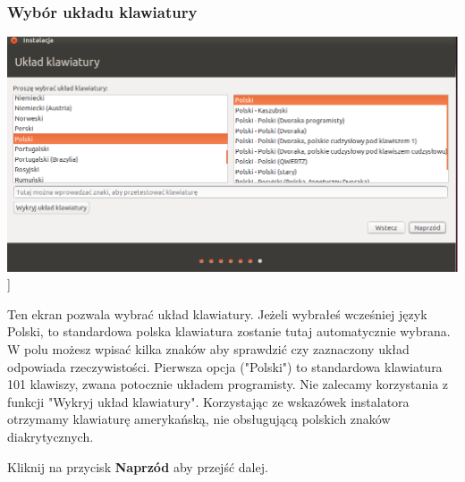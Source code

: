 \subsubsection{Wybór układu klawiatury}
\begin{center}
        \includegraphics[scale=0.5]{images/instalator_klawiatura.png}]
\end{center}
Ten ekran pozwala wybrać układ klawiatury. Jeżeli wybrałeś wcześniej język Polski, to standardowa polska klawiatura zostanie tutaj automatycznie wybrana. W polu możesz wpisać kilka znaków aby sprawdzić czy zaznaczony układ odpowiada rzeczywistości. Pierwsza opcja ("Polski") to standardowa klawiatura 101 klawiszy, zwana potocznie układem programisty.
Nie zalecamy korzystania z funkcji "Wykryj układ klawiatury". Korzystając ze wskazówek instalatora otrzymamy klawiaturę amerykańską, nie obsługującą polskich znaków diakrytycznych.
\begin{flushright}
Kliknij na przycisk \textbf{Naprzód} aby przejść dalej.
\end{flushright}
\clearpage
